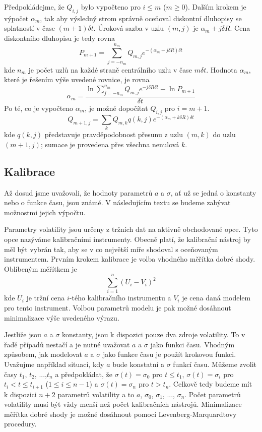 \documentclass[a4paper]{book}
\begin{document}
Předpokládejme, že $Q_{i,j}$ bylo vypočteno pro $i \le m$ ($m \ge 0$). Dalším krokem je výpočet $\alpha_m$, tak aby výsledný strom správně oceňoval diskontní dluhopisy se splatností v čase $(m+1) \delta t$. Úroková sazba v uzlu $(m,j)$ je $\alpha_m + j \delta R$. Cena diskontního dluhopisu je tedy rovna
\begin{equation*}
P_{m+1} = \sum^{n_m}_{j=-n_m} Q_{m,j}e^{-(\alpha_m + j \delta R) \delta t}
\end{equation*}
kde $n_m$ je počet uzlů na každé straně centrálního uzlu v čase $m \delta t$. Hodnota $\alpha_m$, které je řešením výše uvedené rovnice, je rovna
\begin{equation*}
\alpha_m = \frac{\ln \sum^{n_m}_{j = -n_m}Q_{m,j}e^{-j \delta R \delta t} - \ln P_{m+1}}{\delta t}
\end{equation*}
Po té, co je vypočteno $\alpha_m$, je možné dopočítat $Q_{i,j}$ pro $i = m + 1$.
\begin{equation*}
Q_{m+1,j} = \sum_k Q_{m,k}q(k,j)e^{-(\alpha_m + k \delta R) \delta t}
\end{equation*}
kde $q(k,j)$ představuje pravděpodobnost přesunu z uzlu $(m,k)$ do uzlu $(m+1,j)$;  sumace je provedena přes všechna nenulová $k$.

\subsection{Kalibrace}

Až dosud jsme uvažovali, že hodnoty parametrů $a$ a $\sigma$, ať už se jedná o konstanty nebo o funkce času, jsou známé. V následujícím textu se budeme zabývat možnostmi jejich výpočtu.

Parametry volatility jsou určeny z tržních dat na aktivně obchodované opce. Tyto opce nazýváme kalibračními instrumenty. Obecně platí, že kalibrační nástroj by měl být vybrán tak, aby se v co největší míře shodoval s oceňovaným instrumentem. Prvním krokem kalibrace je volba vhodného měřítka dobré shody. Oblíbeným měřítkem je
\begin{equation*}
\sum_{i=1}^n (U_i - V_i)^2
\end{equation*}
kde $U_i$ je tržní cena $i$-tého kalibračního instrumentu a $V_i$ je cena daná modelem pro tento instrument. Volbou parametrů modelu je pak možné dosáhnout minimalizace výše uvedeného výrazu.

Jestliže jsou $a$ a $\sigma$ konstanty, jsou k dispozici pouze dva zdroje volatility. To v řadě případů nestačí a je nutné uvažovat $a$ a $\sigma$ jako funkci času. Vhodným způsobem, jak modelovat $a$ a $\sigma$ jako funkce času je použít krokovou funkci. Uvažujme například situaci, kdy $a$ bude konstatní a $\sigma$ funkcí času. Můžeme zvolit časy $t_1$, $t_2$, ...,$t_n$ a předpokládat, že $\sigma (t) = \sigma_0$ pro $t \le t_1$, $\sigma (t) = \sigma_i$ pro $t_i <t \le t_{i+1}$ ($1 \le i \le n - 1$) a $\sigma (t) = \sigma_n$ pro $t > t_n$. Celkově tedy budeme mít k dispozici $n+2$ parametrů volatility a to $a$, $\sigma_0$, $\sigma_1$, ..., $\sigma_n$. Počet parametrů volatility musí být vždy menší než počet kalibračních nástrojů. Minimalizace měřítka dobré shody je možné dosáhnout pomocí Levenberg-Marquardtovy procedury.
\end{document}
